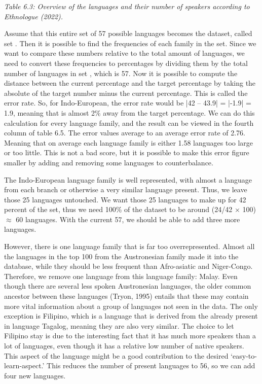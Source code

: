 \vspace{0.1cm}
{\it \footnotesize Table 6.3: Overview of the languages and their number of speakers according to Ethnologue (2022).}
\vspace{0.3cm}


\noindent Assume that this entire set of 57 possible languages becomes the dataset, called set \alpha. Then it is possible to find the frequencies of each family in the \alpha set. Since we want to compare these numbers relative to the total amount of languages, we need to convert these frequencies to percentages by dividing them by the total number of languages in set \alpha, which is 57. Now it is possible to compute the distance between the current percentage and the target percentage by taking the absolute of the target number minus the current percentage. This is called the error rate. So, for Indo-European, the error rate would be |42 – 43.9| = |-1.9| = 1.9, meaning that is almost 2\% away from the target percentage. We can do this calculation for every language family, and the result can be viewed in the fourth column of table 6.5. The error values average to an average error rate of 2.76. Meaning that on average each language family is either 1.58 languages too large or too little. This is not a bad score, but it is possible to make this error figure smaller by adding and removing some languages to counterbalance. 

The Indo-European language family is well represented, with almost a language from each branch or otherwise a very similar language present. Thus, we leave those 25 languages untouched. We want those 25 languages to make up for 42 percent of the set, thus we need 100\% of the dataset to be around (24/42 $\times$ 100) $\approx$ 60 languages. With the current 57, we should be able to add three more languages. 

However, there is one language family that is far too overrepresented. Almost all the languages in the top 100 from the Austronesian family made it into the  database, while they should be less frequent than Afro-asiatic and Niger-Congo. Therefore, we remove one language from this language family: Malay. Even though there are several less spoken Austronesian languages, the older common ancestor between these languages (Tryon, 1995) entails that these may contain more vital information about a group of languages not seen in the data. The only exception is Filipino, which is a language that is derived from the already present in  language Tagalog, meaning they are also very similar. The choice to let Filipino stay is due to the interesting fact that it has much more speakers than a lot of languages, even though it has a relative low number of native speakers. This aspect of the language might be a good contribution to the desired ‘easy-to-learn-aspect.’ This reduces the number of present languages to 56, so we can add four new languages. 

